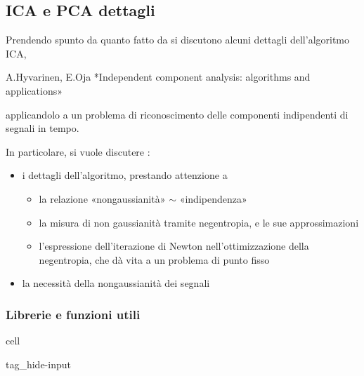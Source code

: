 \documentclass[letterpaper,10pt,italian]{jupyterBook}
\begin{document}
\subsection{ICA e PCA \sphinxhyphen{} dettagli}
\label{\detokenize{ch/ai/ica-pca-details:ica-e-pca-dettagli}}\label{\detokenize{ch/ai/ica-pca-details::doc}}
\sphinxAtStartPar
Prendendo spunto da quanto fatto da  si discutono alcuni dettagli dell’algoritmo ICA,%
\begin{footnote}[1]\sphinxAtStartFootnote
A.Hyvarinen, E.Oja *Independent component analysis: algorithms and applications»
%
\end{footnote} applicandolo a un problema di riconoscimento delle componenti indipendenti di segnali in tempo.

\sphinxAtStartPar
In particolare, si vuole discutere :
\begin{itemize}
\item {} 
\sphinxAtStartPar
i dettagli dell’algoritmo, prestando attenzione a
\begin{itemize}
\item {} 
\sphinxAtStartPar
la relazione «non\sphinxhyphen{}gaussianità» \(\sim\) «indipendenza»

\item {} 
\sphinxAtStartPar
la misura di non gaussianità tramite neg\sphinxhyphen{}entropia, e le sue approssimazioni

\item {} 
\sphinxAtStartPar
l’espressione dell’iterazione di Newton nell’ottimizzazione della neg\sphinxhyphen{}entropia, che dà vita a un problema di punto fisso

\end{itemize}

\item {} 
\sphinxAtStartPar
la necessità della non\sphinxhyphen{}gaussianità dei segnali

\end{itemize}


\subsubsection{Librerie e funzioni utili}
\label{\detokenize{ch/ai/ica-pca-details:librerie-e-funzioni-utili}}
\begin{sphinxuseclass}{cell}
\begin{sphinxuseclass}{tag_hide-input}
\end{sphinxuseclass}
\end{sphinxuseclass}
\end{document}
